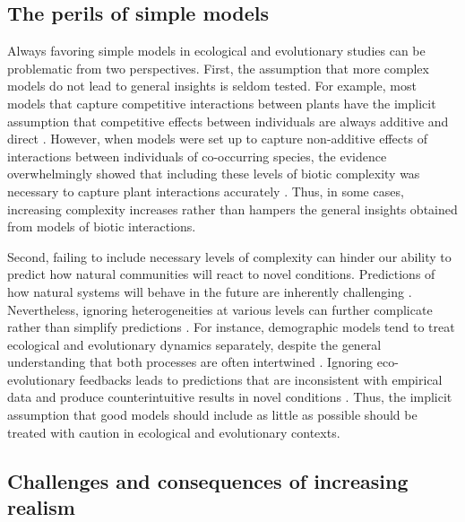 \documentclass[12pt]{article}
\begin{document}
\subsection*{The perils of simple models}
Always favoring simple models in ecological and evolutionary studies can be problematic from two perspectives. First, the assumption that more complex models do not lead to general insights is seldom tested. For example, most models that capture competitive interactions between plants have the implicit assumption that competitive effects between individuals are always additive and direct \citep{schoener1974some,freckleton2001predicting,kraft2015plant}.  However, when models were set up to capture non-additive effects of interactions between individuals of co-occurring species, the evidence overwhelmingly showed that including these levels of biotic complexity was necessary to capture plant interactions accurately \citep{mayfield2017higher,martyn2021identifying,lai2021non}.  Thus, in some cases, increasing complexity increases rather than hampers the general insights obtained from models of biotic interactions.

Second, failing to include necessary levels of complexity can hinder our ability to predict how natural communities will react to novel conditions. Predictions of how natural systems will behave in the future are inherently challenging \citep{sutherland2006predicting}. Nevertheless, ignoring heterogeneities at various levels can further complicate rather than simplify predictions \citep{d2018translucent}. For instance, demographic models tend to treat ecological and evolutionary dynamics separately, despite the general understanding that both processes are often intertwined \citep{macarthur1962some,kokko2007ecogenetic}. Ignoring eco-evolutionary feedbacks leads to predictions that are inconsistent with empirical data and produce counterintuitive results in novel conditions \citep{kokko2007ecogenetic}. Thus, the implicit assumption that good models should include as little as possible should be treated with caution in ecological and evolutionary contexts.



\subsection*{Challenges and consequences of increasing realism}
\end{document}
